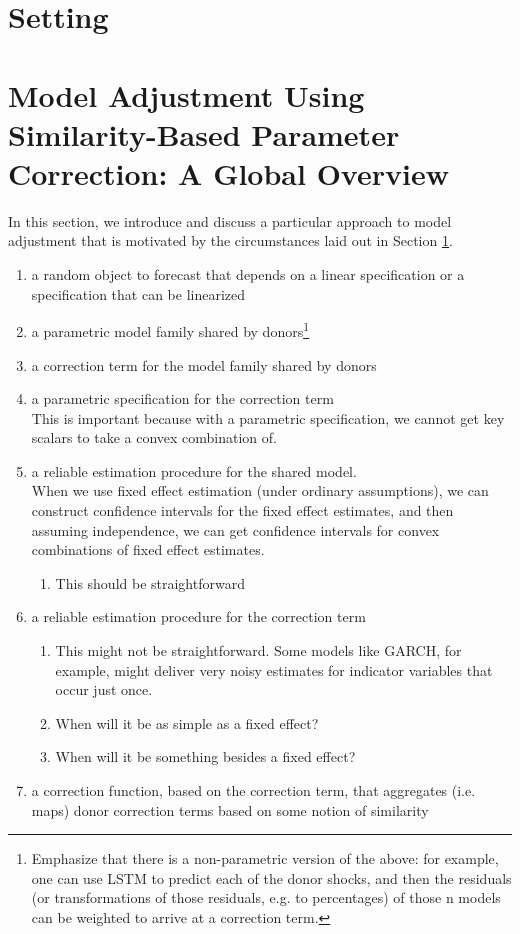 \documentclass[11pt]{article}
\theoremstyle{definition}
\begin{document}
\section{Setting}\label{Section}
\section{Model Adjustment Using Similarity-Based Parameter Correction: A Global Overview}

In this section, we introduce and discuss a particular approach to model adjustment that is motivated by the circumstances laid out in Section \ref{Section}.
\begin{enumerate}
  \item a random object to forecast that depends on a linear specification or a specification that can be linearized
  \item a parametric model family shared by donors\footnote{Emphasize that there is a non-parametric version of the above: for example, one can use LSTM to predict each of the donor shocks, and then the residuals (or transformations of those residuals, e.g. to percentages) of those n models can be weighted to arrive at a correction term.}
  \item a correction term for the model family shared by donors
  \item a parametric specification for the correction term\\
  
  
This is important because with a parametric specification, we cannot get key scalars to take a convex combination of.  

  \item a reliable estimation procedure for the shared model. \\
  
  When we use fixed effect estimation (under ordinary assumptions), we can construct confidence intervals for the fixed effect estimates, and then assuming independence, we can get confidence intervals for convex combinations of fixed effect estimates.
  

  \begin{enumerate}
  \item This should be straightforward
  \end{enumerate}
  \item a reliable estimation procedure for the correction term 
  \begin{enumerate}
    \item This might not be straightforward.  Some models like GARCH, for example, might deliver very noisy estimates for indicator variables that occur just once.
    \item When will it be as simple as a fixed effect?
    \item When will it be something besides a fixed effect?
    \end{enumerate}
  \item a correction function, based on the correction term, that aggregates (i.e. maps) donor correction terms based on some notion of similarity
\end{enumerate}
\end{document}
